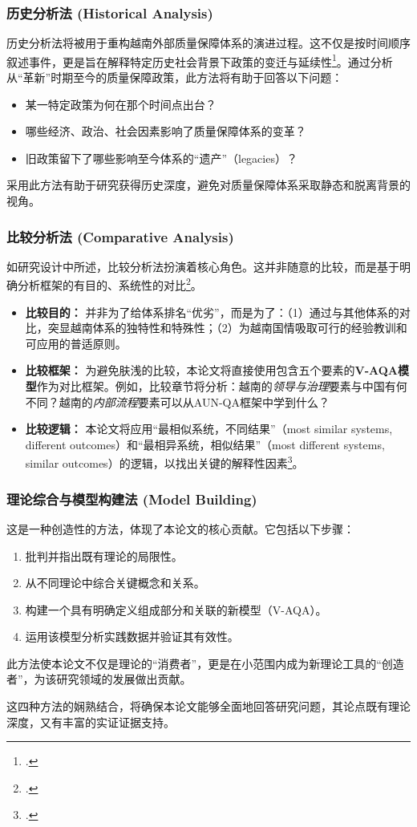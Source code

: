 \subsubsection{历史分析法 (Historical Analysis)}
\label{subsubsec:phan_tich_lich_su}
历史分析法将被用于重构越南外部质量保障体系的演进过程。这不仅是按时间顺序叙述事件，更是旨在解释特定历史社会背景下政策的变迁与延续性\footcite{Tosh2015}。通过分析从“革新”时期至今的质量保障政策，此方法将有助于回答以下问题：
\begin{itemize}
    \item 某一特定政策为何在那个时间点出台？
    \item 哪些经济、政治、社会因素影响了质量保障体系的变革？
    \item 旧政策留下了哪些影响至今体系的“遗产”（legacies）？
\end{itemize}
采用此方法有助于研究获得历史深度，避免对质量保障体系采取静态和脱离背景的视角。

\subsubsection{比较分析法 (Comparative Analysis)}
\label{subsubsec:phan_tich_so_sanh}
如研究设计中所述，比较分析法扮演着核心角色。这并非随意的比较，而是基于明确分析框架的有目的、系统性的对比\footcite{Sartori1991}。
\begin{itemize}
    \item \textbf{比较目的：} 并非为了给体系排名“优劣”，而是为了：（1）通过与其他体系的对比，突显越南体系的独特性和特殊性；（2）为越南国情吸取可行的经验教训和可应用的普适原则。
    \item \textbf{比较框架：} 为避免肤浅的比较，本论文将直接使用包含五个要素的\textbf{V-AQA模型}作为对比框架。例如，比较章节将分析：越南的\textit{领导与治理}要素与中国有何不同？越南的\textit{内部流程}要素可以从AUN-QA框架中学到什么？
    \item \textbf{比较逻辑：} 本论文将应用“最相似系统，不同结果”（most similar systems, different outcomes）和“最相异系统，相似结果”（most different systems, similar outcomes）的逻辑，以找出关键的解释性因素\footcite{PrzeworskiTeune1970}。
\end{itemize}

\subsubsection{理论综合与模型构建法 (Model Building)}
\label{subsubsec:xay_dung_mo_hinh}
这是一种创造性的方法，体现了本论文的核心贡献。它包括以下步骤：
\begin{enumerate}
    \item 批判并指出既有理论的局限性。
    \item 从不同理论中综合关键概念和关系。
    \item 构建一个具有明确定义组成部分和关联的新模型（V-AQA）。
    \item 运用该模型分析实践数据并验证其有效性。
\end{enumerate}
此方法使本论文不仅是理论的“消费者”，更是在小范围内成为新理论工具的“创造者”，为该研究领域的发展做出贡献。

这四种方法的娴熟结合，将确保本论文能够全面地回答研究问题，其论点既有理论深度，又有丰富的实证证据支持。










